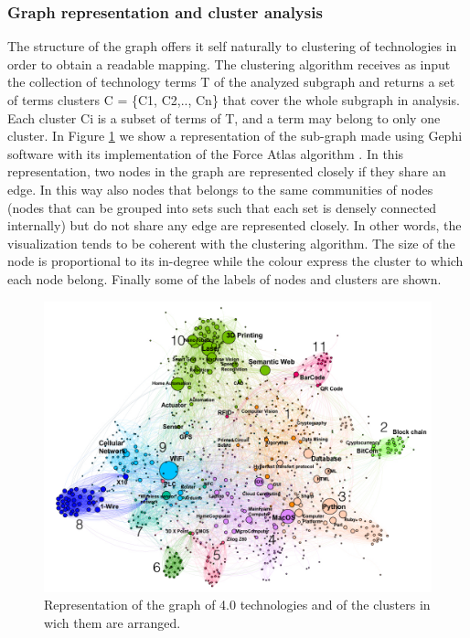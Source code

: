 \documentclass[]{book}
\begin{document}
\subsubsection*{Graph representation and cluster
analysis}\label{graph-representation-and-cluster-analysis}

The structure of the graph offers it self naturally to clustering of
technologies in order to obtain a readable mapping. The clustering
algorithm receives as input the collection of technology terms T of the
analyzed subgraph and returns a set of terms clusters C = \{C1, C2,..,
Cn\} that cover the whole subgraph in analysis. Each cluster Ci is a
subset of terms of T, and a term may belong to only one cluster. In
Figure \ref{fig:technimetro} we show a representation of the sub-graph
made using Gephi software with its implementation of the Force Atlas
algorithm \citep{ICWSM09154} . In this representation, two nodes in the
graph are represented closely if they share an edge. In this way also
nodes that belongs to the same communities of nodes (nodes that can be
grouped into sets such that each set is densely connected internally)
but do not share any edge are represented closely. In other words, the
visualization tends to be coherent with the clustering algorithm. The
size of the node is proportional to its in-degree while the colour
express the cluster to which each node belong. Finally some of the
labels of nodes and clusters are shown.

\begin{figure}

{\centering \includegraphics[width=1\linewidth]{_bookdown_files/figures/Graph_Tech.001} 

}

\caption{ Representation of the graph of 4.0 technologies and of the clusters in wich them are arranged.}\label{fig:technimetro}
\end{figure}
\end{document}

